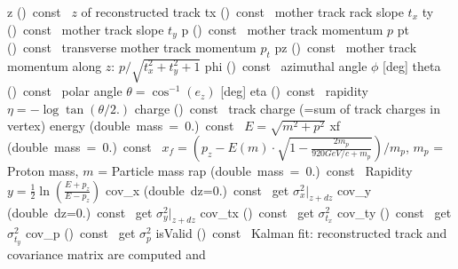 \documentclass{article}
\begin{document}
\begin{cxxentry}
\begin{cxxclass}
\begin{cxxpublic}
\label{cxx.2.1.52}
        {z}
        {()\ const\ }
        { $z$ of reconstructed track}
        {}
\label{cxx.2.1.53}
        {tx}
        {()\ const\ }
        { mother track rack slope $t_x$}
        {}
\label{cxx.2.1.54}
        {ty}
        {()\ const\ }
        { mother track slope $t_y$}
        {}
\label{cxx.2.1.55}
        {p}
        {()\ const\ }
        { mother track momentum $p$}
        {}
\label{cxx.2.1.56}
        {pt}
        {()\ const\ }
        { transverse mother track momentum $p_t$}
        {}
\label{cxx.2.1.57}
        {pz}
        {()\ const\ }
        { mother track momentum along $z$: $p / \sqrt{t_x^2+t_y^2+1}$ }
        {}
\label{cxx.2.1.58}
        {phi}
        {()\ const\ }
        { azimuthal angle $\phi$ [deg]}
        {}
\label{cxx.2.1.59}
        {theta}
        {()\ const\ }
        { polar angle $\theta = \cos^{-1}(e_z)$ [deg]}
        {}
\label{cxx.2.1.60}
        {eta}
        {()\ const\ }
        { rapidity $\eta = -\log\tan(\theta/2.)$}
        {}
\label{cxx.2.1.61}
        {charge}
        {()\ const\ }
        { track charge (=sum of track charges in vertex)}
        {}
\label{cxx.2.1.62}
        {energy}
        {(double\ mass\ =\ 0.)\ const\ }
        { $E = \sqrt{m^2 + p^2}$}
        {}
\label{cxx.2.1.63}
        {xf}
        {(double\ mass\ =\ 0.)\ const\ }
        {$x_f = (p_z - E(m)\cdot\sqrt{1 - \frac{2m_p}{920 GeV/c + m_p}})/m_p$,
$m_p$ = Proton mass, $m$ = Particle mass }
        {}
\label{cxx.2.1.64}
        {rap}
        {(double\ mass\ =\ 0.)\ const\ }
        { Rapidity $y = \frac{1}{2}\ln(\frac{E+p_z}{E-p_z})$}
        {}
\label{cxx.2.1.65}
        {cov\_x}
        {(double\ dz=0.)\ const\ }
        { get $\sigma_x^2|_{z+dz}$}
        {}
\label{cxx.2.1.66}
        {cov\_y}
        {(double\ dz=0.)\ const\ }
        { get $\sigma_y^2|_{z+dz}$}
        {}
\label{cxx.2.1.67}
        {cov\_tx}
        {()\ const\ }
        { get $\sigma_{t_x}^2$}
        {}
\label{cxx.2.1.68}
        {cov\_ty}
        {()\ const\ }
        { get $\sigma_{t_y}^2$}
        {}
\label{cxx.2.1.69}
        {cov\_p}
        {()\ const\ }
        { get $\sigma_p^2$}
        {}
\label{cxx.2.1.70}
        {isValid}
        {()\ const\ }
        {Kalman fit: reconstructed track and covariance matrix are computed and
}
\end{cxxpublic}
\end{cxxclass}
\end{cxxentry}
\end{document}
